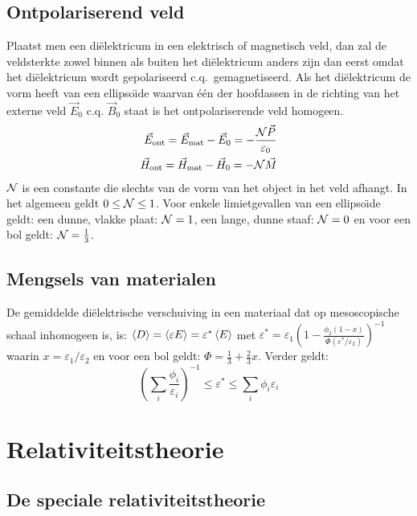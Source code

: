 \section{Ontpolariserend veld}
Plaatst men een di\"elektricum in een elektrisch of magnetisch veld, dan zal
de veldsterkte zowel binnen als buiten het di\"elektricum anders zijn dan
eerst omdat het di\"elektricum wordt gepolariseerd c.q.\ gemagnetiseerd. Als
het di\"elektricum de vorm heeft van een ellipso\"{\i}de waarvan \'e\'en der
hoofdassen in de richting van het externe veld $\vec{E}_0$ c.q. $\vec{B}_0$
staat is het ontpolariserende veld homogeen.
\begin{eqnarray*}
\vec{E}_{\rm ont}=\vec{E}_{\rm mat}-\vec{E}_0=-\frac{{\cal N}\vec{P}}{\varepsilon_0}\\
\vec{H}_{\rm ont}=\vec{H}_{\rm mat}-\vec{H}_0=-{\cal N}\vec{M}
\end{eqnarray*}
$\cal N$ is een constante die slechts van de vorm van het object in het veld
afhangt. In het algemeen geldt $0\leq{\cal N}\leq1$. Voor enkele
limietgevallen van een ellipso\"{\i}de geldt: een dunne, vlakke plaat:
${\cal N}=1$, een lange, dunne staaf: ${\cal N}=0$ en voor een bol geldt:
${\cal N}=\frac{1}{3}$.

\section{Mengsels van materialen}
De gemiddelde di\"elektrische verschuiving in een materiaal dat op mesoscopische
schaal inhomogeen is, is: $\left\langle D \right\rangle=\left\langle \varepsilon E \right\rangle=\varepsilon^*\left\langle E \right\rangle$ met
$\displaystyle \varepsilon^*=\varepsilon_1\left(1-\frac{\phi_2(1-x)}{\Phi(\varepsilon^*/\varepsilon_2)}\right)^{-1}$
waarin $x=\varepsilon_1/\varepsilon_2$ en voor een bol geldt:
$\Phi=\frac{1}{3}+\frac{2}{3}x$. Verder geldt:
\[
\left(\sum_i \frac{\phi_i}{\varepsilon_i}\right)^{-1}\leq\varepsilon^*\leq\sum_i \phi_i\varepsilon_i
\]

\chapter{Relativiteitstheorie}
\section{De speciale relativiteitstheorie}
